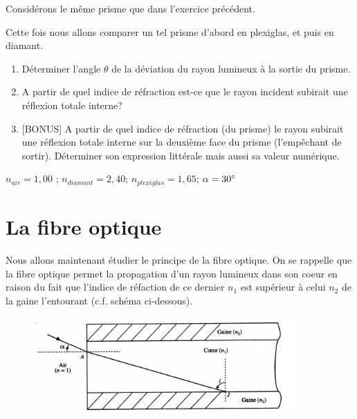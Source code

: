 \documentclass[11pt,a4paper]{article}
\begin{document}
Considérons le même prisme que dans l'exercice précédent. 

Cette fois nous allons comparer un tel prisme d'abord en plexiglas, et puis en diamant.

\begin{enumerate}
    \item Déterminer l'angle $\theta$ de la déviation du rayon lumineux à la sortie du prisme. 
    \item A partir de quel indice de réfraction est-ce que le rayon incident subirait une réflexion totale interne?
    \item $[$BONUS$]$ A partir de quel indice de réfraction (du prisme) le rayon subirait une réflexion totale interne sur la deuxième face du prisme (l'empêchant de sortir). Déterminer son expression littérale mais aussi sa valeur numérique. 
\end{enumerate}

\begin{tcolorbox}[title=Données]
$n_{air}=1,00$ \quad ; \quad $n_{diamant}=2,40$\quad ; \quad $n_{plexiglas}=1,65$\quad ; \quad $\alpha=30\degree$  
\end{tcolorbox}

\endgroup

\section{La fibre optique}
Nous allons maintenant étudier le principe de la fibre optique. On se rappelle que la fibre optique permet la propagation d'un rayon lumineux dans son coeur en raison du fait que l'indice de réfaction de ce dernier $n_1$ est supérieur à celui $n_2$ de la gaine l'entourant (c.f. schéma ci-dessous). 

\begin{figure}[h]
    \centering
    \includegraphics[width=0.9\textwidth]{refraction/fibre1.jpg}
\end{figure}
\end{document}
